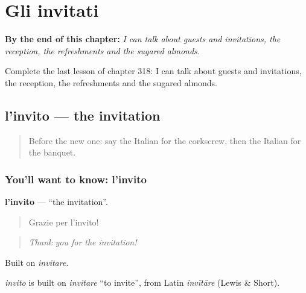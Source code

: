 
\chapter{Gli invitati}
\label{ch:it-gli-invitati}

\begin{chapteropening}
\textbf{By the end of this chapter:} \emph{I can talk about guests and invitations, the reception, the refreshments and the sugared almonds.}

Complete the last lesson of chapter 318: I can talk about guests and invitations, the reception, the refreshments and the sugared almonds.
\end{chapteropening}

\section[l'invito]{l'invito — the invitation}

\label{lesson:IT-C318-invito}



\begin{quote}
Before the new one: say the Italian for the corkscrew, then the Italian for the banquet.
\end{quote}

\subsection*{You'll want to know: l'invito}
\textbf{l'invito} — \textquotedblleft{}the invitation\textquotedblright{}.

\begin{quote}
Grazie per l'invito!
\end{quote}

\begin{quote}
\emph{Thank you for the invitation!}
\end{quote}

Built on \emph{invitare}.

\begin{cousinweb}
\emph{invito} is built on \emph{invitare} \textquotedblleft{}to invite\textquotedblright{}, from Latin \emph{invītāre} (Lewis \& Short).
\end{cousinweb}

